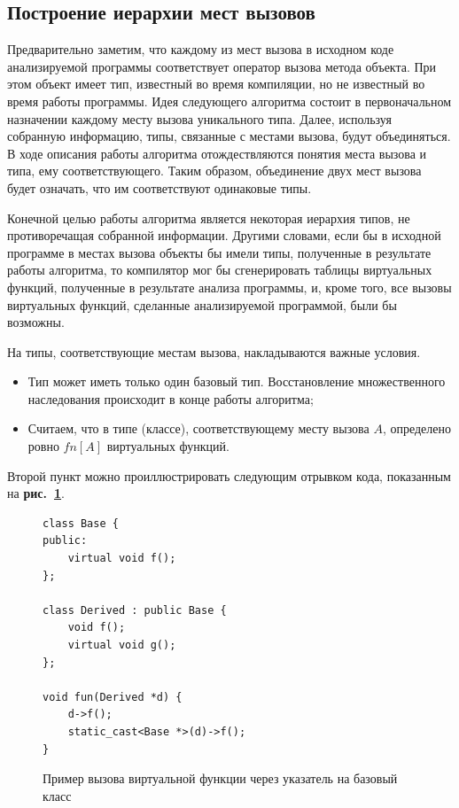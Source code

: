 \documentclass[a4paper,12pt,russian]{article}
\newcommand{\picref}[1]{\textbf{рис.~\ref{#1}}}
\begin{document}
\subsection{Построение иерархии мест вызовов}
Предварительно заметим, что каждому из мест вызова в исходном коде анализируемой программы соответствует оператор вызова метода объекта.
При этом объект имеет тип, известный во время компиляции, но не известный во время работы программы.
Идея следующего алгоритма состоит в первоначальном назначении каждому месту вызова уникального типа.
Далее, используя собранную информацию, типы, связанные с местами вызова, будут объединяться.
В ходе описания работы алгоритма отождествляются понятия места вызова и типа, ему соответствующего.
Таким образом, объединение двух мест вызова будет означать, что им соответствуют одинаковые типы.

Конечной целью работы алгоритма является некоторая иерархия типов, не противоречащая собранной информации.
Другими словами, если бы в исходной программе в местах вызова объекты бы имели типы, полученные в результате работы алгоритма,
то компилятор мог бы сгенерировать таблицы виртуальных функций, полученные в результате анализа программы, и, кроме того, все вызовы виртуальных функций, сделанные анализируемой программой, были бы возможны.

На типы, соответствующие местам вызова, накладываются важные условия.
\begin{itemize}
\item Тип может иметь только один базовый тип. Восстановление множественного наследования происходит в конце работы алгоритма;
\item Считаем, что в типе (классе), соответствующему месту вызова $A$, определено ровно $fn[A]$ виртуальных функций.
\end{itemize}
Второй пункт можно проиллюстрировать следующим отрывком кода, показанным на \picref{min_vsize_ex_lst}.
\begin{figure}
\begin{lstlisting}
class Base {
public:
    virtual void f();
};

class Derived : public Base {
    void f();
    virtual void g();
};

void fun(Derived *d) {
    d->f();
    static_cast<Base *>(d)->f();
}
\end{lstlisting}
\caption{Пример вызова виртуальной функции через указатель на базовый класс}
\label{min_vsize_ex_lst}
\end{figure}
\end{document}
